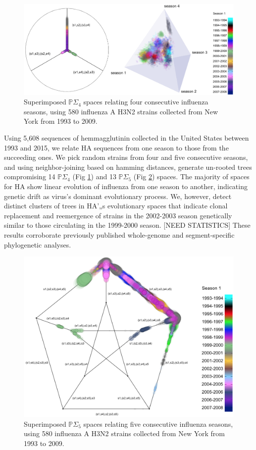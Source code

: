\documentclass[a4paper,11pt]{article}
\begin{document}
\begin{figure}
    \centering
    \includegraphics[width=6in]{figures/influenza_quad.png}
    \caption{Superimposed $\mathbb{P}\Sigma_4$ spaces relating four consecutive influenza seasons, using 580 influenza A H3N2 strains collected from New York from 1993 to 2009.}
    \label{fig:flu_quad}
\end{figure} 

Using 5,608 sequences of hemmagglutinin collected in the United States between 1993 and 2015, we relate HA sequences from one season to those from the succeeding ones.
We pick random strains from four and five consecutive seasons, and using neighbor-joining based on hamming distances, generate un-rooted trees compromising 14 $\mathbb{P}\Sigma_4$ (Fig \ref{fig:flu_quad}) and 13 $\mathbb{P}\Sigma_5$  (Fig \ref{fig:flu_quint}) spaces.
The majority of spaces for HA show linear evolution of influenza from one season to another, indicating genetic drift as virus's dominant evolutionary process.
We, however, detect distinct clusters of trees in HA'„s evolutionary spaces that indicate clonal replacement and reemergence of strains in the 2002-2003 season genetically similar to those circulating in the 1999-2000 season. [NEED STATISTICS]
These results corroborate previously published whole-genome and segment-specific phylogenetic analyses.~\cite{holmes2005whole}

\begin{figure}
    \centering
    \includegraphics[width=6in]{figures/influenza_quint.png}
    \caption{Superimposed $\mathbb{P}\Sigma_5$ spaces relating five consecutive influenza seasons, using 580 influenza A H3N2 strains collected from New York from 1993 to 2009.}
    \label{fig:flu_quint}
\end{figure} 
\end{document}
